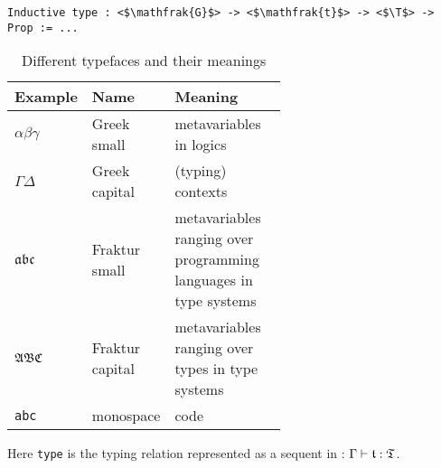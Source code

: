 \begin{verbatim}
Inductive type : <$\mathfrak{G}$> -> <$\mathfrak{t}$> -> <$\T$> -> Prop := ...
\end{verbatim}

\begin{table}[t]
    \centering
    \begin{tabular}{l|l|p{0.6\linewidth}}
        Example & Name & Meaning  \\
        \hline
        $\alpha\beta\gamma$ & Greek small & metavariables in logics \\
        $\Gamma\Delta$ & Greek capital & (typing) contexts \\
        $\mathfrak{a}\mathfrak{b}\mathfrak{c}$ & Fraktur small & metavariables ranging over programming languages in type systems \\
        $\mathfrak{A}\mathfrak{B}\mathfrak{C}$ & Fraktur capital & metavariables ranging over types in type systems \\
        \texttt{abc} & monospace & code
    \end{tabular}
    \caption{Different typefaces and their meanings}
    \label{tab:fonts}
\end{table}

Here \texttt{type} is the typing relation represented as a sequent in : $\Gamma \vdash \mathfrak{t} : \mathfrak{T}$.